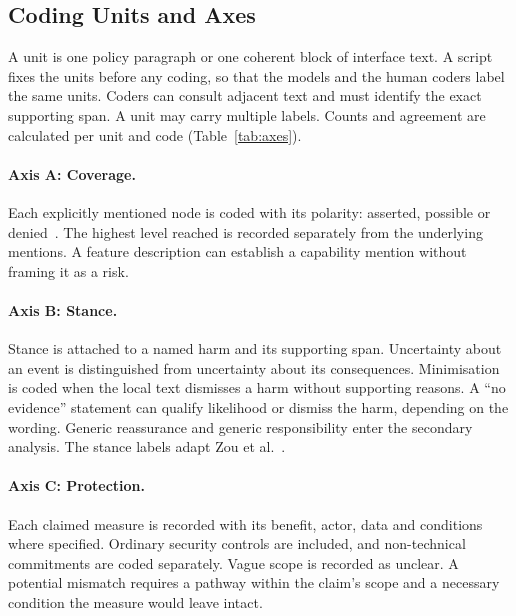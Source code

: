 \subsection{Coding Units and Axes}
\label{sec:axes}
A unit is one policy paragraph or one coherent block of interface text. A script fixes the units
before any coding, so that the models and the human coders label the same units. Coders can
consult adjacent text and must identify the exact supporting span. A unit may carry multiple
labels. Counts and agreement are calculated per unit and code (Table~\ref{tab:axes}).

\paragraph{Axis A: Coverage.} Each explicitly mentioned node is coded with its polarity:
asserted, possible or denied~\parencite[\S1]{andow2019policylint}. The highest level reached is
recorded separately from the underlying mentions. A feature description can establish a
capability mention without framing it as a risk.

\paragraph{Axis B: Stance.} Stance is attached to a named harm and its supporting span.
Uncertainty about an event is distinguished from uncertainty about its consequences.
Minimisation is coded when the local text dismisses a harm without supporting reasons. A
\enquote{no evidence} statement can qualify likelihood or dismiss the harm, depending on the
wording. Generic reassurance and generic responsibility enter the secondary analysis. The stance
labels adapt Zou et al.~\parencite[pp.~7, 10]{zou2019might}.

\paragraph{Axis C: Protection.} Each claimed measure is recorded with its benefit, actor, data
and conditions where specified. Ordinary security controls are included, and non-technical
commitments are coded separately. Vague scope is recorded as unclear. A potential mismatch
requires a pathway within the claim's scope and a necessary condition the measure would leave
intact.


